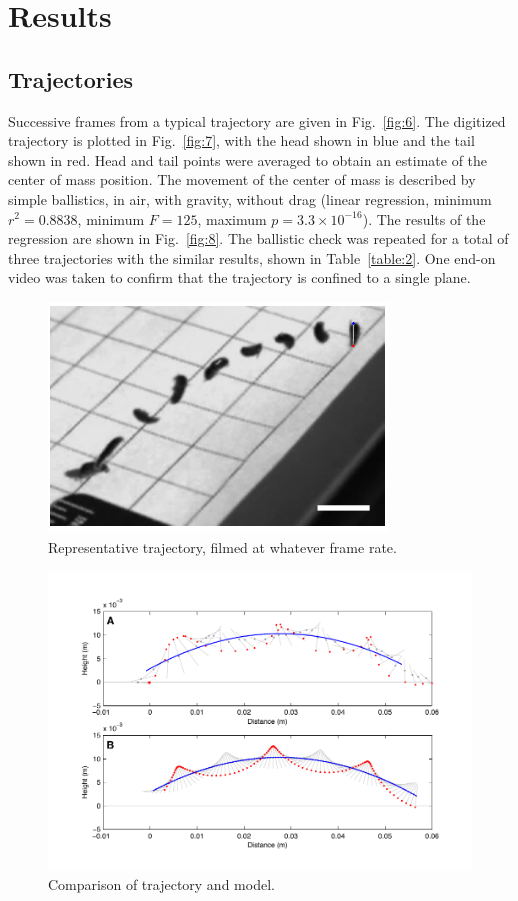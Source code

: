 \documentclass{jeb}
\begin{document}
\section{Results}

\subsection{Trajectories}
	Successive frames from a typical trajectory are given in Fig.~\ref{fig:6}.  The digitized trajectory is plotted in Fig.~\ref{fig:7}, with the head shown in blue and the tail shown in red.  Head and tail points were averaged to obtain an estimate of the center of mass position.  The movement of the center of mass is described by simple ballistics, in air, with gravity, without drag (linear regression, minimum $r^2=0.8838$, minimum $F=125$, maximum $p=3.3 \times 10^{-16}$).  The results of the regression are shown in Fig.~\ref{fig:8}.  The ballistic check was repeated for a total of three trajectories with the similar results, shown in Table~\ref{table:2}.  One end-on video was taken to confirm that the trajectory is confined to a single plane.
\begin{figure}
\begin{center}
\includegraphics{figures/HyaleTrajectoryPhoto.pdf}
\end{center}
\caption{Representative trajectory, filmed at whatever frame rate.}
\end{figure}

\begin{figure}
\begin{center}
\includegraphics{figures/AmphipodTrajectoriesFull.pdf}
\end{center}
\caption{Comparison of trajectory and model.}
\end{figure}
\end{document}

